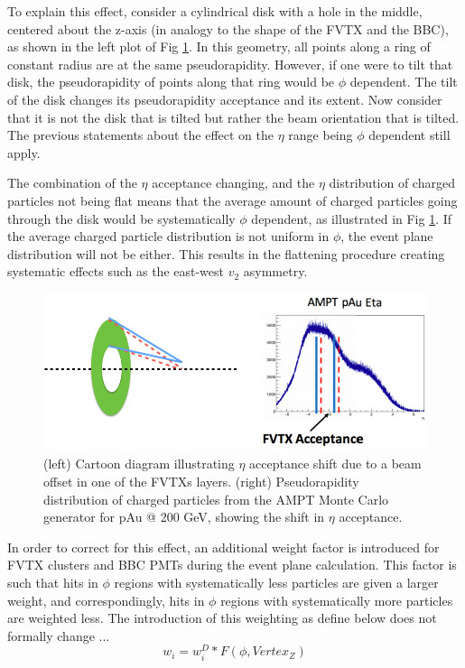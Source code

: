 To explain this effect, consider a cylindrical disk with a hole in the middle, centered about the z-axis (in analogy to the shape of the FVTX and the BBC), as shown in the left plot of Fig \ref{fig:tilt_effect}. In this geometry, all points along a ring of constant radius are at the same pseudorapidity. However, if one were to tilt that disk, the pseudorapidity of points along that ring would be $\phi$ dependent. The tilt of the disk changes its pseudorapidity acceptance and its extent. Now consider that it is not the disk that is tilted but rather the beam orientation that is tilted. The previous statements about the effect on the $\eta$ range being $\phi$ dependent still apply. 

The combination of the $\eta$ acceptance changing, and the $\eta$ distribution of charged particles not being flat means that the average amount of charged particles going through the disk would be systematically $\phi$ dependent, as illustrated in Fig \ref{fig:tilt_effect}. If the average charged particle distribution is not uniform in $\phi$, the event plane distribution will not be either. This results in the flattening procedure creating systematic effects such as the east-west $v_2$ asymmetry.

\begin{figure}
\begin{center}
\includegraphics[width=0.95\linewidth]{figs/tilt_effect.png}
\caption{(left) Cartoon diagram illustrating $\eta$ acceptance shift due to a beam offset in one of the FVTXs layers. (right) Pseudorapidity distribution of charged particles from the AMPT Monte Carlo generator for pAu @ 200 GeV, showing the shift in $\eta$ acceptance.}
\label{fig:tilt_effect}
\end{center}
\end{figure}

In order to correct for this effect, an additional weight factor is introduced for FVTX clusters and BBC PMTs during the event plane calculation. This factor is such that hits in $\phi$ regions with systematically less particles are given a larger weight, and correspondingly, hits in $\phi$ regions with systematically more particles are weighted less. The introduction of this weighting as define below does not formally change ...
\begin{equation}
w_i = w^D_i*F(\phi,Vertex_Z)
\label{eqn:modified_weight}
\end{equation}

